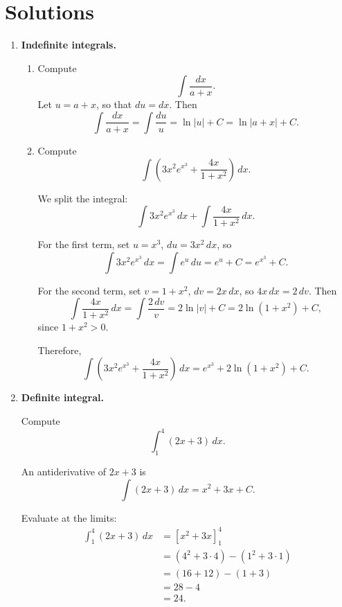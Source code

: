 \documentclass[../main.tex]{subfiles}
\begin{document}
\maketitle

\section*{Solutions}

\begin{enumerate}

\item \textbf{Indefinite integrals.}

\begin{enumerate}
    \item Compute
    \[
      \int \frac{dx}{a+x}.
    \]
    Let $u = a+x$, so that $du = dx$. Then
    \[
      \int \frac{dx}{a+x}
      = \int \frac{du}{u}
      = \ln|u| + C
      = \ln|a+x| + C.
    \]

    \item Compute
    \[
      \int \left(3x^2 e^{x^3} + \frac{4x}{1+x^2}\right) \, dx.
    \]

    We split the integral:
    \[
      \int 3x^2 e^{x^3} \, dx + \int \frac{4x}{1+x^2} \, dx.
    \]

    For the first term, set $u = x^3$, $du = 3x^2 \, dx$, so
    \[
      \int 3x^2 e^{x^3} \, dx = \int e^u \, du = e^u + C = e^{x^3} + C.
    \]

    For the second term, set $v = 1+x^2$, $dv = 2x \, dx$, so $4x \, dx = 2\, dv$. Then
    \[
      \int \frac{4x}{1+x^2} \, dx
      = \int \frac{2\, dv}{v}
      = 2 \ln|v| + C
      = 2 \ln(1+x^2) + C,
    \]
    since $1+x^2>0$.

    Therefore,
    \[
      \int \left(3x^2 e^{x^3} + \frac{4x}{1+x^2}\right) \, dx
      = e^{x^3} + 2 \ln(1+x^2) + C.
    \]

\end{enumerate}


\item \textbf{Definite integral.}

Compute
\[
  \int_{1}^{4} (2x+3)\,dx.
\]

An antiderivative of $2x+3$ is
\[
  \int (2x+3)\,dx = x^2 + 3x + C.
\]

Evaluate at the limits:
\begin{align*}
\int_{1}^{4} (2x+3)\,dx
&= \left[ x^2 + 3x \right]_{1}^{4} \\
&= \left(4^2 + 3\cdot 4\right) - \left(1^2 + 3\cdot 1\right) \\
&= (16+12) - (1+3) \\
&= 28 - 4 \\
&= 24.
\end{align*}


\end{enumerate}
\end{document}
